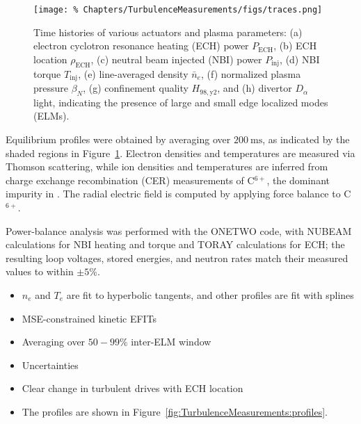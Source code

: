 \begin{figure}
  \centering
  \texttt{[image: \%
    Chapters/TurbulenceMeasurements/figs/traces.png]}
  \caption[Time histories of various actuators \& plasma parameters]{%
    Time histories of various actuators and plasma parameters:
    (a) electron cyclotron resonance heating (ECH) power $P_{\text{ECH}}$,
    (b) ECH location $\rho_{\text{ECH}}$,
    (c) neutral beam injected (NBI) power $P_{\text{inj}}$,
    (d) NBI torque $T_{\text{inj}}$,
    (e) line-averaged density $\bar{n}_e$,
    (f) normalized plasma pressure $\beta_N$,
    (g) confinement quality $H_{98,\text{y}2}$, and
    (h) divertor $D_{\alpha}$ light, indicating
    the presence of large and small edge localized modes (ELMs).
  }
\label{fig:TurbulenceMeasurements:traces}
\end{figure}

Equilibrium profiles were obtained
by averaging over $\SI{200}{\milli\second}$,
as indicated by the shaded regions
in Figure~\ref{fig:TurbulenceMeasurements:traces}.
Electron densities and temperatures
are measured via Thomson scattering, while
ion densities and temperatures
are inferred from charge exchange recombination (CER) measurements
of C$^{6+}$, the dominant impurity in \diiid.
The radial electric field is computed
by applying force balance to C$^{6+}$.

Power-balance analysis was performed with the ONETWO code,
with NUBEAM calculations for NBI heating and torque and
TORAY calculations for ECH;
the resulting loop voltages, stored energies, and neutron rates
match their measured values to within $\pm 5\%$.

\begin{itemize}
  \item $n_e$ and $T_e$ are fit to hyperbolic tangents, and
    other profiles are fit with splines
  \item MSE-constrained kinetic EFITs
  \item Averaging over $50-99\%$ inter-ELM window
  \item Uncertainties
  \item Clear change in turbulent drives with ECH location
  \item The profiles are shown in
    Figure~\ref{fig:TurbulenceMeasurements:profiles}.
\end{itemize}

